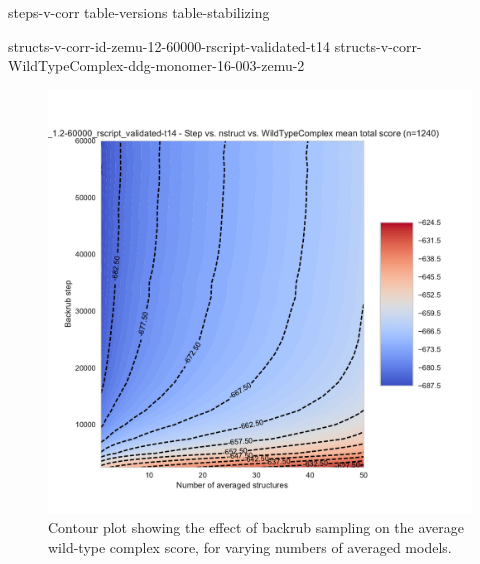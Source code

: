 \documentclass{article}
\begin{document}
\renewcommand{\thefigure}{S\arabic{figure}}
\setcounter{figure}{0}
\renewcommand{\thetable}{S\arabic{table}}
\setcounter{table}{0}

{steps-v-corr}
{table-versions}
{table-stabilizing}

\clearpage

\clearpage

{structs-v-corr-id-zemu-12-60000-rscript-validated-t14}
{structs-v-corr-WildTypeComplex-ddg-monomer-16-003-zemu-2}

\begin{figure}
  \centering
  \includegraphics[width=\textwidth,keepaspectratio]{figures/wildtypecomplex-scores-complete.pdf}
  \caption{
    Contour plot showing the effect of backrub sampling on the average wild-type complex score, for varying numbers of averaged models.
  } \label{fig:wildtypecomplex-scores-complete}
\end{figure}
\end{document}
